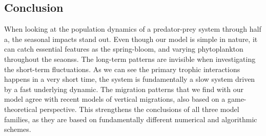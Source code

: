 \subsection{Conclusion} %

When looking at the population dynamics of a predator-prey system through half a, the seasonal impacts stand out. Even though our model is simple in nature, it can catch essential features as the spring-bloom, and varying phytoplankton throughout the seaonss.  The long-term patterns are invisible when investigating the short-term fluctuations. As we can see the primary trophic interactions happens in a very short time, the system is fundamentally a slow system driven by a fast underlying dynamic. The migration patterns that we find with our model agree with  recent models of vertical migrations, also based on a game-theoretical perspective. This strengthens the conclusions of all three model families, as they are based on fundamentally different numerical and algorithmic schemes.
